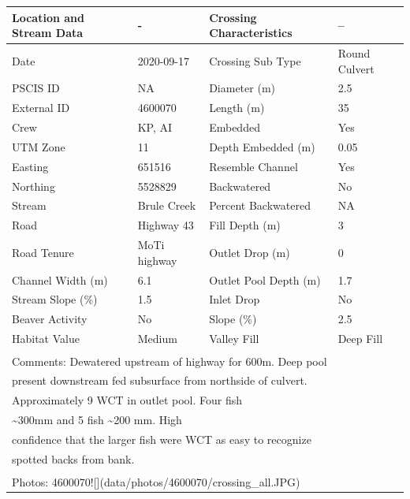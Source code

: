 \documentclass[
]{book}
\begin{document}
\begin{tabular}{llll}
\toprule
Location and Stream Data & - & Crossing Characteristics & --\\
\midrule
Date & 2020-09-17 & Crossing Sub Type & Round Culvert\\
PSCIS ID & NA & Diameter (m) & 2.5\\
External ID & 4600070 & Length (m) & 35\\
Crew & KP, AI & Embedded & Yes\\
UTM Zone & 11 & Depth Embedded (m) & 0.05\\
\addlinespace
Easting & 651516 & Resemble Channel & Yes\\
Northing & 5528829 & Backwatered & No\\
Stream & Brule Creek & Percent Backwatered & NA\\
Road & Highway 43 & Fill Depth (m) & 3\\
Road Tenure & MoTi highway & Outlet Drop (m) & 0\\
\addlinespace
Channel Width (m) & 6.1 & Outlet Pool Depth (m) & 1.7\\
Stream Slope (\%) & 1.5 & Inlet Drop & No\\
Beaver Activity & No & Slope (\%) & 2.5\\
Habitat Value & Medium & Valley Fill & Deep Fill\\
\bottomrule
\multicolumn{4}{l}{\textsuperscript{} Comments: Dewatered upstream of highway for 600m. Deep pool}\\
\multicolumn{4}{l}{present downstream fed subsurface from northside of culvert.}\\
\multicolumn{4}{l}{Approximately 9 WCT in outlet pool.  Four fish}\\
\multicolumn{4}{l}{\textasciitilde{}300mm and 5 fish \textasciitilde{}200 mm. High}\\
\multicolumn{4}{l}{confidence that the larger fish were WCT as easy to recognize}\\
\multicolumn{4}{l}{spotted backs from bank.}\\
\multicolumn{4}{l}{\textsuperscript{} Photos: 4600070![](data/photos/4600070/crossing\_all.JPG)}\\
\end{tabular}
\end{document}
